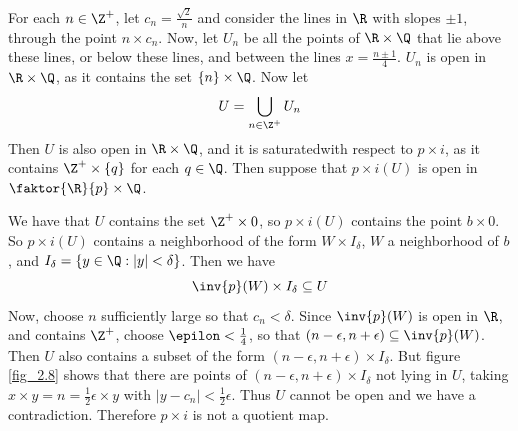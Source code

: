 \begin{example}
\begin{enumerate}
            For each  $n \in \Z^+$, let  $c_n=\frac{\sqrt{2}}{n}$ and consider
            the lines in $\R$ with slopes $\pm 1$, through the point $n \times
            c_n$. Now, let $U_n$ be all the points of $\R \times \Q$ that lie
            above these lines, or below these lines, and between the lines
            $x=\frac{n \pm 1}{4}$. $U_n$ is open in  $\R \times \Q$, as it
            contains the set $\{n\} \times \Q$. Now let
            \begin{equation*}
                U=\bigcup_{n \in \Z^+}{U_n}
            \end{equation*}
            Then $U$ is also open in  $\R \times \Q$, and it is saturatedwith
            respect to  $p \times i$, as it contains  $\Z^+ \times \{q\}$ for
            each $q \in \Q$. Then suppose that  $p \times i(U)$ is open in
            $\faktor{\R}{p} \times \Q$.

            We have that $U$ contains the set  $\Z^+ \times 0$, so $p \times
            i(U)$ contains the point $b \times 0$. So  $p \times i(U)$ contains
            a neighborhood of the form $W \times I_\delta$,  $W$ a neighborhood
            of  $b$, and  $I_\delta=\{y \in \Q : |y|<\delta\}$. Then we have
            \begin{equation*}
                \inv{p}(W) \times I_\delta \subseteq U
            \end{equation*}
            Now, choose $n$ sufficiently large so that  $c_n<\delta$. Since
            $\inv{p}(W)$ is open in $\R$, and contains $\Z^+$, choose
            $\epilon<\frac{1}{4}$, so that $(n-\epsilon,n+\epsilon) \subseteq
            \inv{p}(W)$. Then $U$ also contains a subset of the form
            $(n-\epsilon,n+\epsilon) \times I_\delta$. But figure \ref{fig_2.8}
            shows that there are points of $(n-\epsilon,n+\epsilon) \times
            I_\delta$ not lying in $U$, taking  $x \times
            y=n=\frac{1}{2}\epsilon \times y$ with
            $|y-c_n|<\frac{1}{2}\epsilon$. Thus $U$ cannot be open and we have a
            contradiction. Therefore $p \times i$ is not a quotient map.


\end{enumerate}
\end{example}

